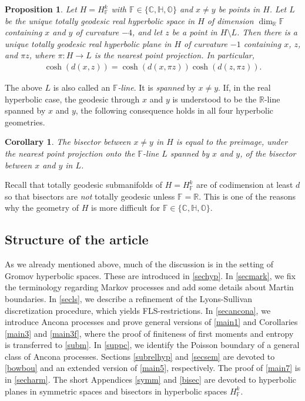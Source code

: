 \documentclass[12pt,a4paper]{amsart}
\newcounter{alph}
\newtheorem{propo}[alph]{Proposition}
\newtheorem{coro}[alph]{Corollary}
\numberwithin{equation}{section}
\theoremstyle{definition}
\def\C{\mathbb C}
\def\F{\mathbb F}
\def\H{\mathbb H}
\def\O{\mathbb O}
\def\R{\mathbb R}
\begin{document}
\begin{propo}\label{bise}
Let $H=H_\F^k$ with $\F\in\{\C,\H,\O\}$ and $x\ne y$ be points in $H$.
Let $L$ be the unique totally geodesic real hyperbolic space in $H$ of dimension $\dim_\R\F$ containing $x$ and $y$ of curvature $-4$,
and let $z$ be a point in $H\setminus L$.
Then there is a unique totally geodesic real hyperbolic plane in $H$ of curvature $-1$ containing $x$, $z$, and $\pi z$, where $\pi\colon H\to L$ is the nearest point projection.
In particular,
\begin{align*}
    \cosh(d(x,z)) = \cosh(d(x,\pi z))\cosh(d(z,\pi z)).
\end{align*}
\end{propo}

The above $L$ is also called an \emph{$\F$-line}.
It is \emph{spanned} by $x\ne y$.
If, in the real hyperbolic case, the geodesic through $x$ and $y$ is understood to be the $\R$-line spanned by $x$ and $y$,
the following consequence holds in all four hyperbolic geometries.

\begin{coro}\label{bise2}
The bisector between $x\ne y$ in $H$ is equal to the preimage, under the nearest point projection onto the $\F$-line $L$ spanned by $x$ and $y$,
of the bisector between $x$ and $y$ in $L$.
\end{coro}

Recall that totally geodesic submanifolds of $H=H_\F^k$ are of codimension at least $d$ so that bisectors are \emph{not} totally geodesic unless $\F=\R$.
This is one of the reasons why the geometry of $H$ is more difficult for $\F\in\{\C,\H,\O\}$.

\subsection{Structure of the article}\label{struc}
As we already mentioned above, much of the discussion is in the setting of Gromov hyperbolic spaces.
These are introduced in \cref{sechyp}.
In \cref{secmark}, we fix the terminology regarding Markov processes and add some details about Martin boundaries. 
In \cref{secls}, we describe a refinement of the Lyons-Sullivan discretization procedure, which yields FLS-restrictions.
In \cref{secancona}, we introduce Ancona processes and prove general versions of \cref{main1} and Corollaries \ref{main3} and \ref{main3f}, where the proof of finiteness of first moments and entropy is transferred to \cref{subm}.
In \cref{suppc}, we identify the Poisson boundary of a general class of Ancona processes.
Sections \ref{subrelhyp} and \ref{secsem} are devoted to \cref{bowbou} and an extended version of \cref{main5}, respectively.
The proof of \cref{main7} is in \cref{secharm}.
The short Appendices \ref{symm} and \ref{bisec} are devoted to  hyperbolic planes in symmetric spaces and bisectors in hyperbolic spaces $H_\F^k$.
\end{document}
